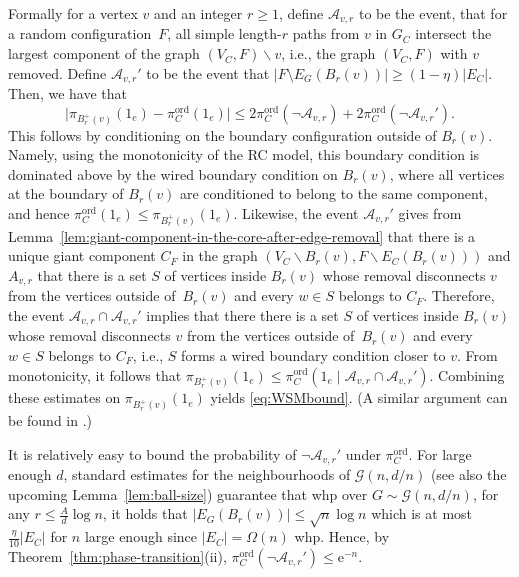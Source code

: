 \documentclass[11pt]{article}
\theoremstyle{plain}
\newcommand{\G}{\mathcal{G}}
\newcommand{\A}{\mathcal{A}}
\newcommand{\emm}{\mathrm{e}}
\newcommand{\1}{\mathbb{1}}
\newcommand{\ord}{\mathrm{ord}}
\begin{document}
Formally for a vertex \(v\) and an integer \(r\geq 1\), define \(\A_{v,r}\) to be the event, that for a random configuration~\(F\), all simple length-\(r\) paths from \(v\) in \(G_C\) intersect the largest component of the graph $(V_C,F)\backslash v$, i.e., the graph $(V_C,F)$ with $v$ removed. Define \(\A_{v,r}'\) to be the event that $|F \setminus E_G(B_r(v))| \geq (1-\eta)|E_C|$. Then, we have that
\begin{equation}\label{eq:WSMbound}
    \big|\pi_{B^+_r(v)}(1_e) - \pi^\ord_C(1_e)\big|\leq 2\pi^\ord_C(\neg\A_{v,r}) + 2\pi^\ord_C(\neg\A_{v,r}').
\end{equation}
This follows by conditioning on the boundary configuration outside of $B_r(v)$. Namely, using the monotonicity of the RC model, this boundary condition is dominated above by the wired boundary condition on $B_r(v)$, where all vertices at the boundary of $B_r(v)$ are conditioned to belong to the same component, and hence $\pi^\ord_C(1_e)\leq \pi_{B_r^+(v)}(1_e)$. Likewise, the event $\mathcal{A}_{v,r}'$ gives from Lemma~\ref{lem:giant-component-in-the-core-after-edge-removal} that there is a unique giant component $C_{F}$ in the graph $(V_C\backslash B_r(v), F\backslash E_C(B_r(v)))$ and $A_{v,r}$ that there is a  set $S$ of vertices inside $B_r(v)$ whose removal disconnects 
$v$ from the vertices outside of~$B_r(v)$ and every $w\in S$ belongs to $C_F$. Therefore, the event  $\mathcal{A}_{v,r}\cap \mathcal{A}_{v,r}'$ implies that there there is a  set $S$ of vertices inside $B_r(v)$ whose removal disconnects 
$v$ from the vertices outside of~$B_r(v)$ and every $w\in S$ belongs to $C_F$, i.e.,   $S$  forms a wired boundary condition closer to $v$. From monotonicity, it follows that $\pi_{B_r^+(v)}(1_e)\leq \pi^\ord_C(1_e\mid \mathcal{A}_{v,r}\cap \mathcal{A}_{v,r}')$. Combining these estimates on $\pi_{B_r^+(v)}(1_e)$ yields \eqref{eq:WSMbound}.  (A similar argument can be found in \cite[Lemma 5.7]{galanis2024plantingmcmcsamplingpottsarxiv}.)




It is relatively easy to bound the probability of $\neg \mathcal{A}_{v,r}'$ under $\pi^{\ord}_C$. For large enough $d$, standard estimates for the neighbourhoods of $\G(n,d/n)$ (see also the upcoming Lemma~\ref{lem:ball-size}) guarantee that whp over \(G\sim\G(n,d/n)\), for any \(r\leq \tfrac{A}{d}\log n\), it holds that \(|E_G(B_r(v))|\leq \sqrt n\log n\) which is at most \(\tfrac{\eta}{10}|E_C|\) for $n$ large enough since $|E_C|=\Omega(n)$ whp. Hence, by Theorem~\ref{thm:phase-transition}(ii), $\pi^{\ord}_C(\neg \mathcal{A}_{v,r}')\leq \emm^{-n}$.
\end{document}
